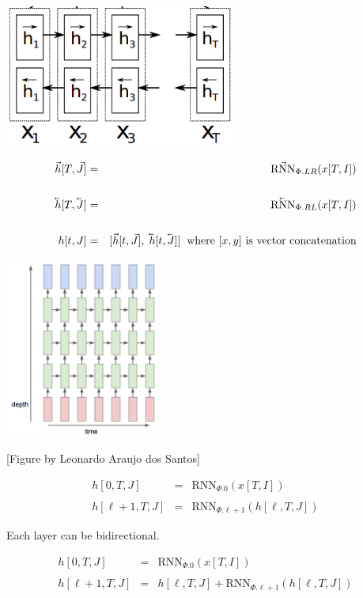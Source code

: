 {

\centerline{\includegraphics[width = 3in]{../images/biRNN}}

\begin{eqnarray*}
\vec{h}[T,\vec{J}] & = & \vec{\mathrm{RNN}}_{\Phi.LR}(x[T,I]) \\
\\
\cev{h}[T,\cev{J}] & = & \cev{\mathrm{RNN}}_{\Phi.RL}(x[T,I]) \\
\\
h[t,J] & = & [\vec{h}[t,\vec{J}],\;\cev{h}[t,\cev{J}]]\;\;\mbox{where $[x,y]$ is vector concatenation}
\end{eqnarray*}



\centerline{\includegraphics[width = 2in]{../images/RNNstack}}
\centerline{\large [Figure by Leonardo Araujo dos Santos]}

\begin{eqnarray*}
h[0,T,J] & = & \mathrm{RNN}_{\Phi.0}(x[T,I]) \\
\\
h[\ell+1,T,J] & = & \mathrm{RNN}_{\Phi.\ell+1}(h[\ell,T,J])
\end{eqnarray*}

Each layer can be bidirectional.


\begin{eqnarray*}
h[0,T,J] & = & \mathrm{RNN}_{\Phi.0}(x[T,I]) \\
\\
h[\ell+1,T,J] & = & h[\ell,T,J] + \mathrm{RNN}_{\Phi.\ell+1}(h[\ell,T,J])
\end{eqnarray*}

}
